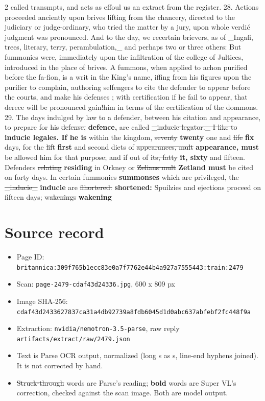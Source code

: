 \documentclass[10pt]{article}
\begin{document}
\begin{multicols}{2}
called transmpts, and acts as effoul us an extract from the register. 28. Actions proceeded anciently upon brives lifting from the chancery, directed to the judiciary or judge-ordinary, who tried the matter by a jury, upon whole verdić judgment was pronounced. And to the day, we recertain brievers, as of \_Ingafi, trees, literary, terry, perambulation,\_ and perhaps two or three others: But fummonies were, immediately upon the infiltration of the college of Jultices, introduced in the place of brives. A fummons, when applied to achon purified before the fa-fion, is a writ in the King's name, iffing from his figures upon the purifier to complain, authoring selfengers to cite the defender to appear before the courts, and make his defenses ; with certification if he fail to appear, that derece will be pronounced gain!him in terms of the certification of the dommons. 29. The days indulged by law to a defender, between his citation and appearance, to prepare for his \sout{defense,} \textbf{defence,} are called \sout{\_inducie legator.\_ I like to} \textbf{inducie legales. If he is} within the kingdom, \sout{seventy} \textbf{twenty} one and \sout{life} \textbf{fix} days, for the \sout{lift} \textbf{first} and second diets of \sout{appearances, mult} \textbf{appearance, must} be allowed him for that purpose; and if out of \sout{its, fatty} \textbf{it, sixty} and fifteen. Defenders \sout{relating} \textbf{residing} in Orkney or \sout{Zelians mult} \textbf{Zetland must} be cited on forty days. In certain \sout{fummonies} \textbf{summonses} which are privileged, the \sout{\_inducie\_} \textbf{inducie} are \sout{flhortered:} \textbf{shortened:} Spuilzies and ejections proceed on fifteen days; \sout{wakenings} \textbf{wakening}
\end{multicols}
\section*{Source record}
\begin{itemize}
\item Page ID: \texttt{britannica:309f765b1ecc83e0a7f7762e44b4a927a7555443:train:2479}
\item Scan: \texttt{page-2479-cdaf43d24336.jpg}, 600 x 809 px
\item Image SHA-256: \texttt{\small cdaf43d2433627837ca31a4db92739a8fdb6045d1d0abc637abfebf2fc448f9a}
\item Extraction: \texttt{nvidia/nemotron-3.5-parse}, raw reply \texttt{artifacts/extract/raw/2479.json}
\item Text is Parse OCR output, normalized (long s as s, line-end hyphens joined). It is not corrected by hand.
\item \sout{Struck-through} words are Parse's reading; \textbf{bold} words are Super VL's correction, checked against the scan image. Both are model output.
\end{itemize}
\end{document}
